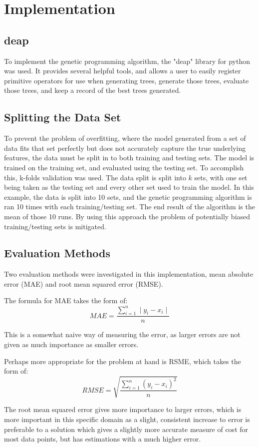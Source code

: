 \documentclass[12pt]{article}
\begin{document}
\newpage
\section{Implementation}
\subsection{deap}
To implement the genetic programming algorithm, the "deap" library for python was used. It provides several helpful tools, and allows a user to easily register primitive operators for use when generating trees, generate those trees, evaluate those trees, and keep a record of the best trees generated.
\subsection{Splitting the Data Set}
To prevent the problem of overfitting, where the model generated from a set of data fits that set perfectly but does not accurately capture the true underlying features, the data must be split in to both training and testing sets. The model is trained on the training set, and evaluated using the testing set. To accomplish this, k-folds validation was used. The data split is split into $k$ sets, with one set being taken as the testing set and every other set used to train the model. In this example, the data is split into 10 sets, and the genetic programming algorithm is ran 10 times with each training/testing set. The end result of the algorithm is the mean of those 10 runs. By using this approach the problem of potentially biased training/testing sets is mitigated.

\subsection{Evaluation Methods}
Two evaluation methods were investigated in this implementation, mean absolute error (MAE) and root mean squared error (RMSE).

The formula for MAE takes the form of: $$MAE = \frac{\sum\limits_{i=1}^n \mid y_i - x_i \mid}{n}$$

This is a somewhat naive way of measuring the error, as larger errors are not given as much importance as smaller errors.

Perhaps more appropriate for the problem at hand is RSME, which takes the form of: $$RMSE = \sqrt{\frac{\sum\limits_{i=1}^n (y_i - x_i)^2}{n}}$$

 The root mean squared error gives more importance to larger errors, which is more important in this specific domain as a slight, consistent increase to error is preferable to a solution which gives a slightly more accurate measure of cost for most data points, but has estimations with a much higher error.
\end{document}
